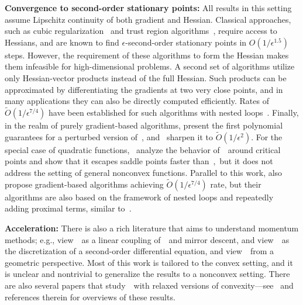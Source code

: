 \textbf{Convergence to second-order stationary points:} All results in this setting assume Lipschitz
continuity of both gradient and Hessian.
Classical approaches, such as cubic regularization~\citep{nesterov2006cubic} and trust region algorithms~\citep{curtis2014trust}, require access to Hessians, and are known to find $\epsilon$-second-order stationary points in $O(1/\epsilon^{1.5})$ steps. However, the requirement of these algorithms to form the Hessian makes them infeasible for 
high-dimensional problems. A second set of algorithms utilize only Hessian-vector products instead of the full Hessian. Such products can be approximated by differentiating the gradients at two very close points, and in many applications they can also be directly computed efficiently.
Rates of $\widetilde{O}(1/\epsilon^{7/4})$ have been established for such algorithms with nested loops~\citep{carmon2016accelerated,agarwal2017finding,royer2017complexity}.
Finally, in the realm of purely gradient-based algorithms,
\citet{ge2015escaping} present the first polynomial guarantees for a perturbed version of~\gd, and~\citet{jin2017escape} sharpen it to $\widetilde{O}(1/\epsilon^2)$. For the special case of quadratic functions,~\cite{o2017behavior} analyze the behavior of~\nag~around critical points and show that it escapes saddle points faster than~\gd,~but it does not address the setting of general nonconvex functions.
Parallel to this work, \citet{allen2017neon2, xu2017neon+} also propose gradient-based algorithms achieving $\widetilde{O}(1/\epsilon^{7/4})$ rate,
but their algorithms are also based on the framework of nested loops and repeatedly adding proximal terms, similar to~\citet{carmon2016accelerated}.

\textbf{Acceleration:} There is also a rich literature that aims to understand momentum methods; 
e.g., \citet{allen2014linear} view~\nag~as a linear coupling of~\gd~and mirror descent, \citet{su2016differential} and \citet{wibisono2016} view~\nag~as the discretization of a second-order differential equation, and \citet{bubeck2015geometric} view~\nag~from a geometric perspective. Most of this work is tailored to the convex setting, and it is unclear and nontrivial to generalize the results to a nonconvex setting. There are also several papers that study~\nag~with relaxed versions of convexity---see~\citet{necoara2015linear,li2017provable} and references therein for 
overviews of these results.


